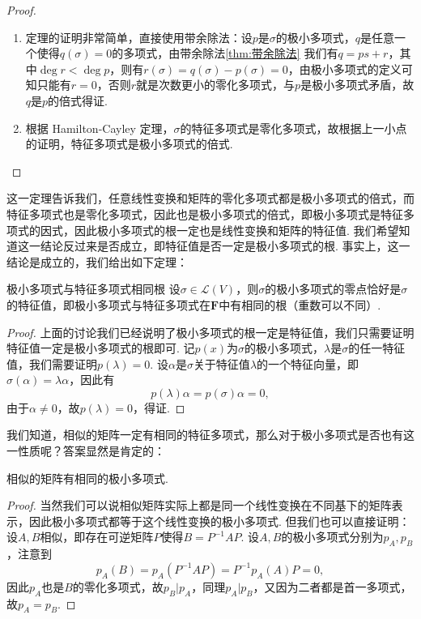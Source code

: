 \begin{proof}
    \begin{enumerate}
        \item 定理的证明非常简单，直接使用带余除法：设$p$是$\sigma$的极小多项式，$q$是任意一个使得$q(\sigma)=0$的多项式，由带余除法\autoref{thm:带余除法} 我们有$q=ps+r$，其中$\deg r<\deg p$，则有$r(\sigma)=q(\sigma)-p(\sigma)=0$，由极小多项式的定义可知只能有$r=0$，否则$r$就是次数更小的零化多项式，与$p$是极小多项式矛盾，故$q$是$p$的倍式得证.

        \item 根据 Hamilton-Cayley 定理，$\sigma$的特征多项式是零化多项式，故根据上一小点的证明，特征多项式是极小多项式的倍式.
    \end{enumerate}
\end{proof}

这一定理告诉我们，任意线性变换和矩阵的零化多项式都是极小多项式的倍式，而特征多项式也是零化多项式，因此也是极小多项式的倍式，即极小多项式是特征多项式的因式，因此极小多项式的根一定也是线性变换和矩阵的特征值. 我们希望知道这一结论反过来是否成立，即特征值是否一定是极小多项式的根. 事实上，这一结论是成立的，我们给出如下定理：
\begin{theorem}{}{极小多项式与特征多项式相同根}
    设$\sigma\in \mathcal{L}(V)$，则$\sigma$的极小多项式的零点恰好是$\sigma$的特征值，即极小多项式与特征多项式在$\mathbf{F}$中有相同的根（重数可以不同）.
\end{theorem}

\begin{proof}
    上面的讨论我们已经说明了极小多项式的根一定是特征值，我们只需要证明特征值一定是极小多项式的根即可. 记$p(x)$为$\sigma$的极小多项式，$\lambda$是$\sigma$的任一特征值，我们需要证明$p(\lambda)=0$. 设$\alpha$是$\sigma$关于特征值$\lambda$的一个特征向量，即$\sigma(\alpha)=\lambda\alpha$，因此有
    \[p(\lambda)\alpha=p(\sigma)\alpha=0,\]
    由于$\alpha\neq 0$，故$p(\lambda)=0$，得证.
\end{proof}

我们知道，相似的矩阵一定有相同的特征多项式，那么对于极小多项式是否也有这一性质呢？答案显然是肯定的：
\begin{theorem}{}{}
    相似的矩阵有相同的极小多项式.
\end{theorem}
\begin{proof}
    当然我们可以说相似矩阵实际上都是同一个线性变换在不同基下的矩阵表示，因此极小多项式都等于这个线性变换的极小多项式. 但我们也可以直接证明：设$A,B$相似，即存在可逆矩阵$P$使得$B=P^{-1}AP$. 设$A,B$的极小多项式分别为$p_A,p_B$，注意到
    \[p_A(B)=p_A(P^{-1}AP)=P^{-1}p_A(A)P=0,\]
    因此$p_A$也是$B$的零化多项式，故$p_B\vert p_A$，同理$p_A\vert p_B$，又因为二者都是首一多项式，故$p_A=p_B$.
\end{proof}

